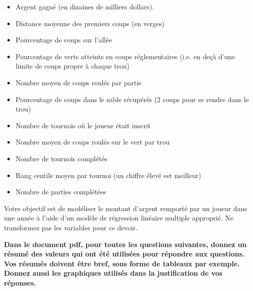 \documentclass[letter, 11pt]{article}
\begin{document}
\begin{itemize}
	\item Argent gagné (en dizaines de milliers dollars). %
	\item Distance moyenne des premiers coups (en verges)
	\item Pourcentage de coups sur l'allée
	\item Pourcentage de verts atteints en coups réglementaires (i.e. en deçà d'une limite de coups propre à chaque trou)
	\item Nombre moyen de coups roulés par partie
	\item Pourcentage de coups dans le sable récupérés (2 coups pour se rendre dans le trou)
	\item Nombre de tournois où le joueur était inscrit
	\item Nombre moyen de coups roulés sur le vert par trou
	\item Nombre de tournois complétés
	\item Rang centile moyen par tournoi (un chiffre élevé est meilleur)
	\item Nombre de parties complétées
\end{itemize}

\vspace{0.1 in}

Votre objectif est de modéliser le montant d'argent remporté par un joueur dans une année à l'aide d'un modèle de régression linéaire multiple approprié. Ne transformez pas les variables pour ce devoir.

\vspace{0.1 in}

{\bf Dans le document pdf, pour toutes les questions suivantes, donnez un résumé des valeurs qui ont été utilisées pour répondre aux questions. Vos résumés doivent être bref, sous forme de tableaux par exemple. Donnez aussi les graphiques utilisés dans la justification de vos réponses.}
\end{document}
